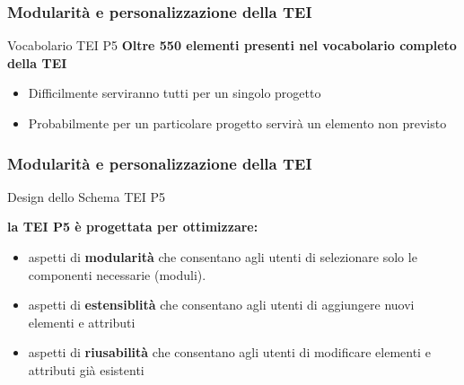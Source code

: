 
    \begin{frame}
        \frametitle{Modularità e personalizzazione della TEI}
        \addtocounter{nframe}{1}
        
    
        \begin{block}{Vocabolario TEI P5}
            \textbf{Oltre 550 elementi presenti nel vocabolario completo della TEI}
                \begin{itemize}
                    \item Difficilmente serviranno tutti per un singolo progetto
                    \item Probabilmente per un particolare progetto servirà un elemento
                    non previsto
                \end{itemize} 
            \end{block}
    \end{frame}

    \begin{frame}
        \frametitle{Modularità e personalizzazione della TEI}
        \addtocounter{nframe}{1}
        
    
        \begin{block}{Design dello Schema TEI P5}
            
            \textbf{la TEI P5 è progettata per ottimizzare:}
                \begin{itemize}
                    \item aspetti di \textbf{modularità} che consentano agli utenti di selezionare solo le componenti necessarie (moduli).
                    \item aspetti di \textbf{estensiblità} che consentano agli utenti di aggiungere nuovi elementi e attributi
                    \item aspetti di \textbf{riusabilità} che consentano agli utenti di modificare elementi e attributi già esistenti
                \end{itemize} 
        \end{block}
        
    \end{frame}


